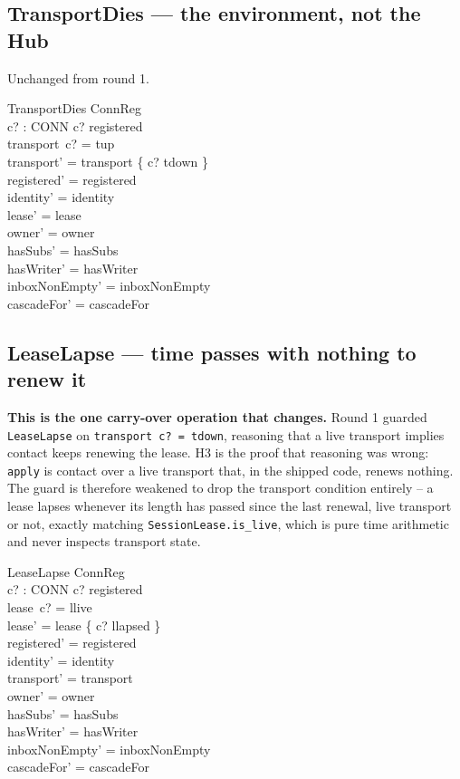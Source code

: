 \documentclass[a4paper,10pt,fleqn]{article}
\begin{document}
\subsection{TransportDies --- the environment, not the Hub}

Unchanged from round 1.

\begin{schema}{TransportDies}
  \Delta ConnReg \\
  c? : CONN
\where
  c? \in registered \\
  transport~c? = tup \\
  transport' = transport \oplus \{ c? \mapsto tdown \} \\
  registered' = registered \\
  identity' = identity \\
  lease' = lease \\
  owner' = owner \\
  hasSubs' = hasSubs \\
  hasWriter' = hasWriter \\
  inboxNonEmpty' = inboxNonEmpty \\
  cascadeFor' = cascadeFor
\end{schema}

\subsection{LeaseLapse --- time passes with nothing to renew it}
\label{sec:leaselapse}

\textbf{This is the one carry-over operation that changes.} Round 1
guarded \texttt{LeaseLapse} on \texttt{transport~c? = tdown}, reasoning
that a live transport implies contact keeps renewing the lease. H3 is the
proof that reasoning was wrong: \texttt{apply} is contact over a live
transport that, in the shipped code, renews nothing. The guard is
therefore weakened to drop the transport condition entirely -- a lease
lapses whenever its length has passed since the last renewal, live
transport or not, exactly matching \texttt{SessionLease.is\_live}, which
is pure time arithmetic and never inspects transport state.

\begin{schema}{LeaseLapse}
  \Delta ConnReg \\
  c? : CONN
\where
  c? \in registered \\
  lease~c? = llive \\
  lease' = lease \oplus \{ c? \mapsto llapsed \} \\
  registered' = registered \\
  identity' = identity \\
  transport' = transport \\
  owner' = owner \\
  hasSubs' = hasSubs \\
  hasWriter' = hasWriter \\
  inboxNonEmpty' = inboxNonEmpty \\
  cascadeFor' = cascadeFor
\end{schema}
\end{document}
